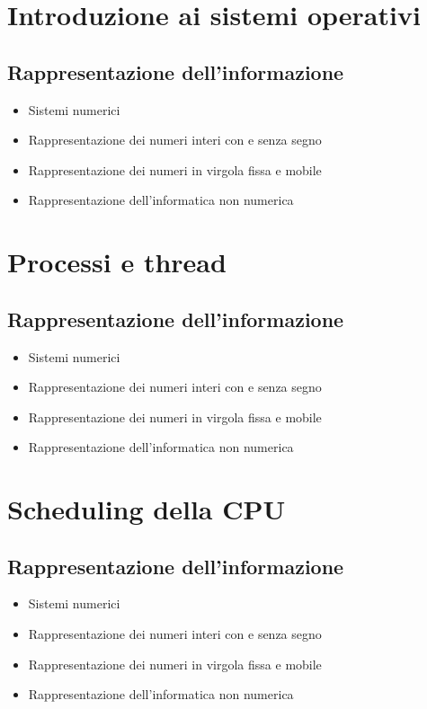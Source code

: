 \documentclass[10pt, a4paper, openany]{book}
\begin{document}
\chapter{Introduzione ai sistemi operativi}
\section{Rappresentazione dell'informazione}
\begin{itemize}
    \item Sistemi numerici
    \item Rappresentazione dei numeri interi con e senza segno
    \item Rappresentazione dei numeri in virgola fissa e mobile
    \item Rappresentazione dell'informatica non numerica
\end{itemize}

\chapter{Processi e thread}
\section{Rappresentazione dell'informazione}
\begin{itemize}
    \item Sistemi numerici
    \item Rappresentazione dei numeri interi con e senza segno
    \item Rappresentazione dei numeri in virgola fissa e mobile
    \item Rappresentazione dell'informatica non numerica
\end{itemize}

\chapter{Scheduling della CPU}
\section{Rappresentazione dell'informazione}
\begin{itemize}
    \item Sistemi numerici
    \item Rappresentazione dei numeri interi con e senza segno
    \item Rappresentazione dei numeri in virgola fissa e mobile
    \item Rappresentazione dell'informatica non numerica
\end{itemize}
\end{document}
